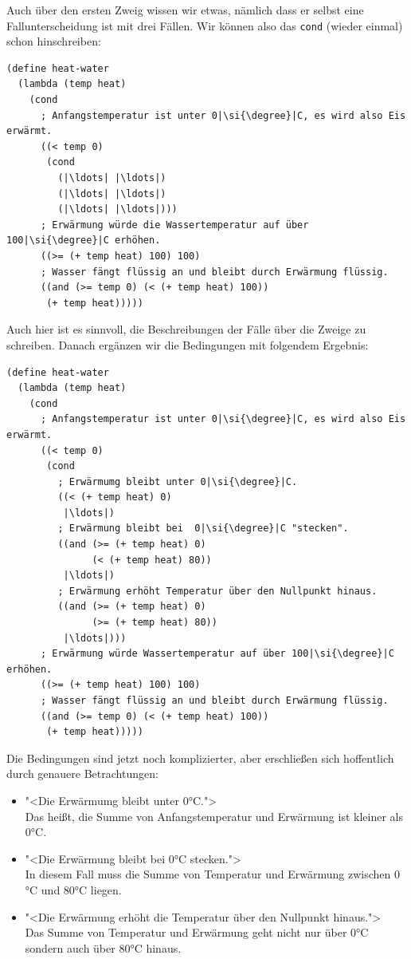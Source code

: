 \mantraschreib*
%
\noindent Auch über den ersten Zweig wissen wir etwas, nämlich dass er selbst
eine Fallunterscheidung ist mit drei Fällen.  Wir können also das
\lstinline{cond} (wieder einmal) schon hinschreiben:
%
\begin{lstlisting}
(define heat-water
  (lambda (temp heat)
    (cond
      ; Anfangstemperatur ist unter 0|\si{\degree}|C, es wird also Eis erwärmt.
      ((< temp 0)
       (cond
         (|\ldots| |\ldots|)
         (|\ldots| |\ldots|)
         (|\ldots| |\ldots|)))
      ; Erwärmung würde die Wassertemperatur auf über 100|\si{\degree}|C erhöhen.
      ((>= (+ temp heat) 100) 100)
      ; Wasser fängt flüssig an und bleibt durch Erwärmung flüssig.
      ((and (>= temp 0) (< (+ temp heat) 100))
       (+ temp heat)))))
\end{lstlisting}
%
Auch hier ist es sinnvoll, die Beschreibungen der Fälle über die
Zweige zu schreiben.  Danach ergänzen wir die Bedingungen mit
folgendem Ergebnis:
%
\begin{lstlisting}
(define heat-water
  (lambda (temp heat)
    (cond
      ; Anfangstemperatur ist unter 0|\si{\degree}|C, es wird also Eis erwärmt.
      ((< temp 0)
       (cond
         ; Erwärmumg bleibt unter 0|\si{\degree}|C.
         ((< (+ temp heat) 0)
          |\ldots|)
         ; Erwärmung bleibt bei  0|\si{\degree}|C "stecken".
         ((and (>= (+ temp heat) 0)
               (< (+ temp heat) 80))
          |\ldots|)
         ; Erwärmung erhöht Temperatur über den Nullpunkt hinaus.
         ((and (>= (+ temp heat) 0)
               (>= (+ temp heat) 80))
          |\ldots|)))
      ; Erwärmung würde Wassertemperatur auf über 100|\si{\degree}|C erhöhen.
      ((>= (+ temp heat) 100) 100)
      ; Wasser fängt flüssig an und bleibt durch Erwärmung flüssig.
      ((and (>= temp 0) (< (+ temp heat) 100))
       (+ temp heat)))))
\end{lstlisting}
%
Die Bedingungen sind jetzt noch komplizierter, aber erschließen sich
hoffentlich durch genauere Betrachtungen:
%
\begin{itemize}
\item "<Die Erwärmumg bleibt unter $0$\si{\degree}C.">\\
  Das heißt, die Summe von
  Anfangstemperatur und Erwärmung ist kleiner als $0$\si{\degree}C.
\item "<Die Erwärmung bleibt bei  0\si{\degree}C stecken.">\\
  In diesem Fall muss die Summe von Temperatur und Erwärmung zwischen $0$\si{\degree}C
  und $80$\si{\degree}C liegen.
\item "<Die Erwärmung erhöht die Temperatur über den Nullpunkt hinaus.">\\
  Das Summe von Temperatur und Erwärmung geht nicht nur über $0$\si{\degree}C
  sondern auch über 80\si{\degree}C hinaus.
\end{itemize}
